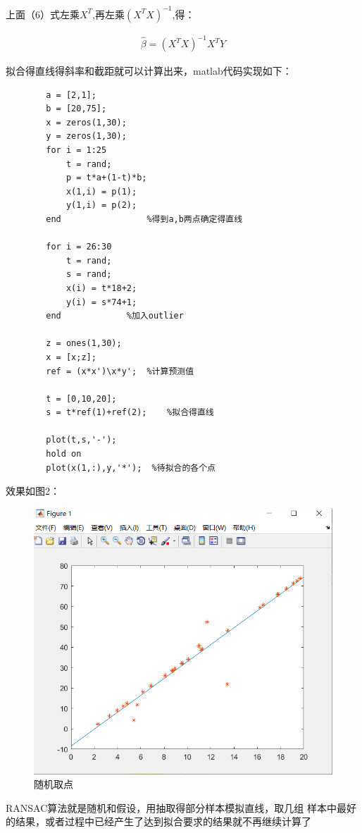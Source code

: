\documentclass{article}
\begin{document}
    上面（6）式左乘$X^T$,再左乘$(X^T X)^{-1}$,得：

    \begin{align}
        \widehat{\beta}=(X^T X)^{-1}X^T Y
    \end{align}

    拟合得直线得斜率和截距就可以计算出来，matlab代码实现如下：

    \begin{lstlisting}
        a = [2,1];
        b = [20,75];
        x = zeros(1,30);
        y = zeros(1,30);
        for i = 1:25 
            t = rand;
            p = t*a+(1-t)*b;
            x(1,i) = p(1);
            y(1,i) = p(2);
        end                 %得到a,b两点确定得直线

        for i = 26:30
            t = rand;
            s = rand;
            x(i) = t*18+2;
            y(i) = s*74+1;
        end             %加入outlier

        z = ones(1,30);
        x = [x;z];
        ref = (x*x')\x*y';  %计算预测值

        t = [0,10,20];
        s = t*ref(1)+ref(2);    %拟合得直线

        plot(t,s,'-');
        hold on
        plot(x(1,:),y,'*');  %待拟合的各个点
    \end{lstlisting}
    
    效果如图2：
    \begin{figure}
        \centering
        \includegraphics[width=0.7\linewidth]{img/2.png}
        \caption{随机取点}
        \label{}
    \end{figure}

    RANSAC算法就是随机和假设，用抽取得部分样本模拟直线，取几组
    样本中最好的结果，或者过程中已经产生了达到拟合要求的结果就不再继续计算了
\end{document}
